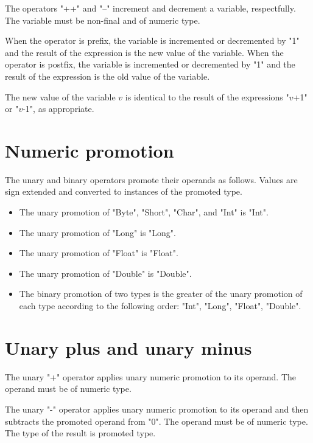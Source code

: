The operators \xcd"++" and \xcd"--" increment and decrement
a variable, respectfully.  The variable must be non-final
and of numeric type.

When the operator is prefix, the variable is
incremented or decremented by \xcd"1" and the result of the expression is
the new value of the variable.
When the operator is postfix, the variable is incremented or
decremented by \xcd"1" and the result of the expression is the old value of
the variable.

The new value of the variable $v$ is identical to the result of
the expressions
\xcdmath"$v$+1" or \xcdmath"$v$-1", as appropriate.

\section{Numeric promotion}
\label{XtenPromotions}

The unary and binary operators promote their operands as
follows.
Values are sign extended and converted to instances of the
promoted type.

\begin{itemize}
\item  The unary promotion of \xcd"Byte", \xcd"Short",
\xcd"Char", and \xcd"Int" is \xcd"Int".
\item  The unary promotion of \xcd"Long" is \xcd"Long".
\item  The unary promotion of \xcd"Float" is \xcd"Float".
\item  The unary promotion of \xcd"Double" is \xcd"Double".
\item The binary promotion of two types is the  
greater of the unary promotion of each type
according to the following order:
\xcd"Int", \xcd"Long", \xcd"Float", \xcd"Double".
\end{itemize}

\section{Unary plus and unary minus}

The unary \xcd"+" operator applies unary numeric promotion to
its operand.   The operand must be of numeric type.

The unary \xcd"-" operator
applies unary numeric promotion to its operand
and then
subtracts the promoted operand from \xcd"0".
The operand must be of numeric type.
The type of the result is promoted type.

